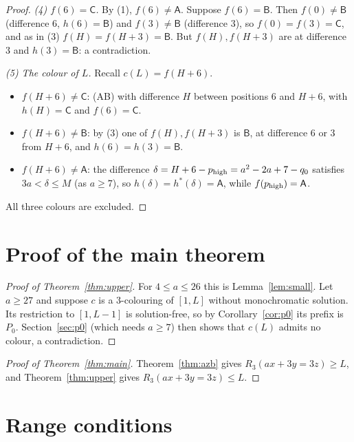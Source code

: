 \documentclass[11pt]{amsart}
\theoremstyle{definition}
\theoremstyle{remark}
\newcommand{\cA}{\mathsf{A}}\newcommand{\cB}{\mathsf{B}}\newcommand{\cC}{\mathsf{C}}
\newcommand{\Pz}{P_0}
\begin{document}
\begin{proof}
\emph{(4) $f(6)=\cC$.} By (1), $f(6)\ne\cA$. Suppose $f(6)=\cB$. Then $f(0)\ne\cB$ (difference $6$, $h(6)=\cB$) and
$f(3)\ne\cB$ (difference $3$), so $f(0)=f(3)=\cC$, and as in (3) $f(H)=f(H+3)=\cB$. But $f(H),f(H+3)$ are at
difference $3$ and $h(3)=\cB$: a contradiction.

\emph{(5) The colour of $L$.} Recall $c(L)=f(H+6)$.
\begin{itemize}
\item $f(H+6)\ne\cC$: (AB) with difference $H$ between positions $6$ and $H+6$, with $h(H)=\cC$ and $f(6)=\cC$.
\item $f(H+6)\ne\cB$: by (3) one of $f(H),f(H+3)$ is $\cB$, at difference $6$ or $3$ from $H+6$, and $h(6)=h(3)=\cB$.
\item $f(H+6)\ne\cA$: the difference $\delta=H+6-p_{\rm high}=a^2-2a+7-q_0$ satisfies $3a<\delta\le M$ (as $a\ge7$),
so $h(\delta)=h^\ast(\delta)=\cA$, while $f(p_{\rm high})=\cA$.
\end{itemize}
All three colours are excluded.
\end{proof}

\section{Proof of the main theorem}

\begin{proof}[Proof of Theorem~\ref{thm:upper}]
For $4\le a\le26$ this is Lemma~\ref{lem:small}. Let $a\ge27$ and suppose $c$ is a $3$-colouring of $[1,L]$ without
monochromatic solution. Its restriction to $[1,L-1]$ is solution-free, so by Corollary~\ref{cor:p0} its prefix is
$\Pz$. Section~\ref{sec:p0} (which needs $a\ge7$) then shows that $c(L)$ admits no colour, a contradiction.
\end{proof}

\begin{proof}[Proof of Theorem~\ref{thm:main}]
Theorem~\ref{thm:azb} gives $R_3(ax+3y=3z)\ge L$, and Theorem~\ref{thm:upper} gives $R_3(ax+3y=3z)\le L$.
\end{proof}

\section{Range conditions}\label{sec:ranges}
\end{document}
